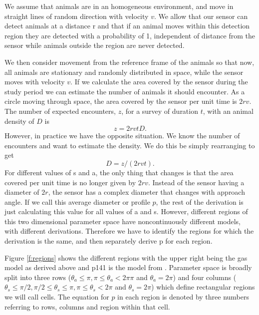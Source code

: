 \documentclass[a4paper,10pt,reqno,oneside]{amsart}
\begin{document}
We assume that animals are in an homogeneous environment, and move in straight lines of random direction with velocity $v$. We allow that our sensor can detect animals at a distance r and that if an animal moves within this detection region they are detected with a probability of 1, independent of distance from the sensor while animals outside the region are never detected.

We then consider movement from the reference frame of the animals so that now, all animals are stationary and randomly distributed in space, while the sensor moves with velocity $v$. If we calculate the area covered by the sensor during the study period we can estimate the number of animals it should encounter. As a circle moving through space, the area covered by the sensor per unit time is $2rv$. The number of expected encounters, $z$, for a survey of duration $t$, with an animal density of $D$ is
\begin{equation}
	z = 2rvtD.
\end{equation}
However, in practice we have the opposite situation. We know the number of encounters and want to estimate the density. We do this be simply rearranging to get
\begin{equation}
	D = z/(2rvt).
\end{equation}
For different values of s and a, the only thing that changes is that the area covered per unit time is no longer given by $2rv$. Instead of the sensor having a diameter of $2r$, the sensor has a complex diameter that changes with approach angle. If we call this average diameter or profile $p$, the rest of the derivation is just calculating this value for all values of a and s. However, different regions of this two dimensional parameter space have noncontinuously different models, with different derivations. Therefore we have to identify the regions for which the derivation is the same, and then separately derive p for each region.

Figure \ref{f:regions} shows the different regions with the upper right being the gas model as derived above and p141 is the model from \citep{rowcliffe2008estimating}. Parameter space is broadly split into three rows ($ \theta_a \le \pi, \pi \le \theta_a < 2π\pi$ and $ \theta_a = 2\pi$) and four columns ($ \theta_s \le \pi/2,  \pi/2 \le \theta_s \le  \pi,  \pi \le \theta_s < 2\pi$ and $\theta_s = 2\pi$) which define rectangular regions we will call cells. The equation for $p$ in each region is denoted by three numbers referring to rows, columns and region within that cell. 
\end{document}
